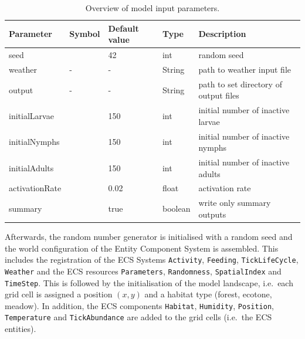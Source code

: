 \documentclass[a4paper, 11pt]{scrartcl}
\newcommand{\inlinecode}[1]{\texttt{\small #1}}
\begin{document}
\begin{table}[h!]
\caption[Overview of model input parameters.]{Overview of model input parameters.}
\label{tab:initialisation_parameters}
\begin{tabularx}{\textwidth}{lllll}
\toprule
\textbf{Parameter} 	& \textbf{Symbol} & \textbf{Default value} & \textbf{Type} & \textbf{Description} \\
\midrule
seed    			&   & 42    & int     & random seed \\
weather     		& - & -     & String  & path to weather input file \\
output     			& - & -     & String  & path to set directory of output files \\
initialLarvae       &   & 150   & int     & initial number of inactive larvae \\
initialNymphs       &   & 150   & int     & initial number of inactive nymphs \\
initialAdults       &   & 150   & int     & initial number of inactive adults \\
activationRate      &   & 0.02  & float   & activation rate  \\
summary       		&   & true & boolean & write only summary outputs \\
\bottomrule
\end{tabularx}
\end{table}

Afterwards, the random number generator is initialised with a random seed and the world configuration of the Entity Component System is assembled. This includes the registration of the ECS Systems \inlinecode{Activity}, \inlinecode{Feeding}, \inlinecode{TickLifeCycle}, \inlinecode{Weather} and the ECS resources \inlinecode{Parameters}, \inlinecode{Randomness}, \inlinecode{SpatialIndex} and \inlinecode{TimeStep}. This is followed by the initialisation of the model landscape, i.e.\ each grid cell is assigned a position $(x, y)$ and a habitat type (forest, ecotone, meadow). In addition, the ECS components \inlinecode{Habitat}, \inlinecode{Humidity}, \inlinecode{Position}, \inlinecode{Temperature} and \inlinecode{TickAbundance} are added to the grid cells (i.e.\ the ECS entities).
\end{document}
